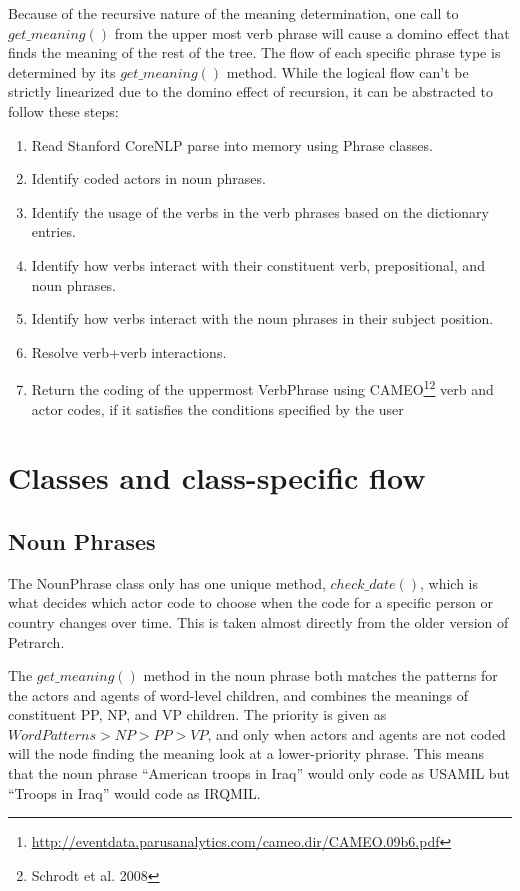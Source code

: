 \documentclass[11pt]{article}
\begin{document}
Because of the recursive nature of the meaning determination, one call to 
$get\_meaning()$ from the upper most verb phrase will cause a domino effect that 
finds the meaning of the rest of the tree. The flow of each specific phrase type 
is determined by its $get\_meaning()$ method. While the logical flow can't be 
strictly linearized due to the domino effect of recursion, it can be 
abstracted to follow these steps:
\begin{enumerate}
  \item Read Stanford CoreNLP parse into memory using Phrase classes.  
  \item Identify coded actors in noun phrases.
  \item Identify the usage of the verbs in the verb phrases based on the 
  dictionary entries.
  \item Identify how verbs interact with their constituent verb, prepositional, and noun 
  phrases.
  \item Identify how verbs interact with the noun phrases in their subject 
  position.
  \item Resolve verb+verb interactions.
  \item Return the coding of the uppermost VerbPhrase using CAMEO\footnote{\url{http://eventdata.parusanalytics.com/cameo.dir/CAMEO.09b6.pdf}}\footnote{Schrodt et al. 2008} verb and actor codes, if it satisfies the 
  conditions specified by the user
\end{enumerate}
\section{Classes and class-specific flow}
\subsection{Noun Phrases}
The NounPhrase class only has one unique method, $check\_date()$, which is what 
decides which actor code to choose when the code for a specific person or 
country changes over time. This is taken almost directly from the older version 
of Petrarch. 

The $get\_meaning()$ method in the noun phrase both matches the patterns for the 
actors and agents of word-level children, and combines the meanings of 
constituent PP, NP, and VP children. The priority is given as $Word Patterns > NP > PP 
> VP$, and only when actors and agents are not coded will the node finding the 
meaning look at a lower-priority phrase. This means that the noun phrase 
``American troops in Iraq'' would only code as USAMIL but ``Troops in Iraq'' would code as 
IRQMIL. 
\end{document}
